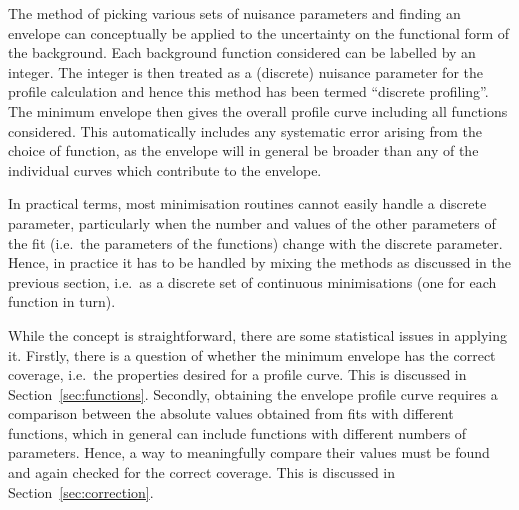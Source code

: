 The method of picking various sets of nuisance parameters and finding
an envelope can conceptually be applied to the uncertainty on the functional form of the background.
Each background function considered can be labelled by an
integer. The integer is then treated as a (discrete) nuisance parameter
for the profile calculation and hence this method has been termed
``discrete profiling''.
The minimum envelope then gives the overall profile curve including
all functions considered. This automatically includes any systematic error
arising from the choice of function, as the envelope will in general be broader
than any of the individual curves which contribute to the envelope.

In practical terms, most minimisation routines
cannot easily handle a discrete parameter, particularly when the
number and values of the other parameters of the fit (i.e.~the parameters
of the functions) change with the discrete parameter.
Hence, in practice it has
to be handled by mixing the methods as discussed in the previous section,
i.e.~as a discrete set of continuous minimisations (one for each function in turn).

While the concept is straightforward, there are some statistical
issues in applying it.
Firstly, there is a question of whether the \nll minimum envelope has the correct coverage,
i.e.~the properties desired for a profile curve.
This is discussed in Section~\ref{sec:functions}.
Secondly, obtaining the envelope profile curve requires a
comparison between the absolute \nll values obtained from fits with different functions, which
in general can include functions with different numbers of parameters.
Hence, a way to meaningfully compare their \nll values must be found and 
again checked for the correct coverage.
This is discussed in Section~\ref{sec:correction}.
